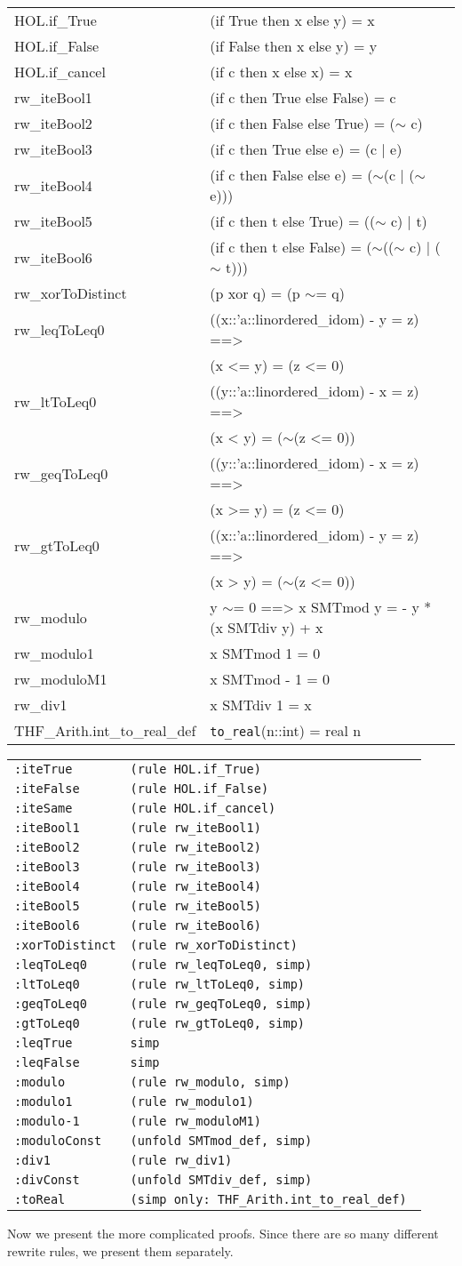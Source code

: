 \documentclass[10pt,a4paper]{article}
\newcommand{\ttt}{\texttt}
\newcommand{\negat}{\ensuremath{\sim}}
\newcommand{\nega}{\negat\xspace}
\newcommand{\torealx}{\texttt{to\_real}}
\newcommand{\toreal}{\torealx\xspace}
\newenvironment{pt}[1]{\begin{center}\begin{tt}\begin{tabular}{#1}\hline}{\end{tabular}\end{tt}\end{center}}
\newcommand{\pl}[1]{#1 \\[1mm]}
\newcommand{\pll}[1]{#1 \\\hline}
\newenvironment{rt}{\begin{center}\begin{tabular}{|l l|}\hline}{\end{tabular}\end{center}}
\newcommand{\rl}[2]{\rm{#1} & \tt{#2} \\[1mm]}
\newcommand{\rll}[2]{\rm{#1} & \tt{#2} \\\hline}
\def\ind{\quad}
\begin{document}
\begin{pt}{ll}
	\pl{HOL.if\_True & (if True then x else y) = x}
	\pl{HOL.if\_False & (if False then x else y) = y}
	\pl{HOL.if\_cancel & (if c then x else x) = x}
	\pl{rw\_iteBool1 & (if c then True else False) = c}
	\pl{rw\_iteBool2 & (if c then False else True) = (\nega c)}
	\pl{rw\_iteBool3 & (if c then True else e) = (c | e)}
	\pl{rw\_iteBool4 & (if c then False else e) = (\nega (c | (\nega e)))}
	\pl{rw\_iteBool5 & (if c then t else True) = ((\nega c) | t)}
	\pl{rw\_iteBool6 & (if c then t else False) = (\nega ((\nega c) | (\nega t)))}
	\pl{rw\_xorToDistinct & (p xor q) = (p \negat= q)}
	\pl{rw\_leqToLeq0 & ((x::'a::linordered\_idom) - y = z) ==>}
		\pl{& \ind (x <= y) = (z <= 0)}
	\pl{rw\_ltToLeq0 & ((y::'a::linordered\_idom) - x = z) ==>}
		\pl{& \ind (x < y) = (\nega (z <= 0))}
	\pl{rw\_geqToLeq0 & ((y::'a::linordered\_idom) - x = z) ==>}
		\pl{& \ind (x >= y) = (z <= 0)}
	\pl{rw\_gtToLeq0 & ((x::'a::linordered\_idom) - y = z) ==>}
		\pl{& \ind (x > y) = (\nega (z <= 0))}
	\pl{rw\_modulo & y \negat= 0 ==> x SMTmod y = - y * (x SMTdiv y) + x}
	\pl{rw\_modulo1 & x SMTmod 1 = 0}
	\pl{rw\_moduloM1 & x SMTmod - 1 = 0}
	\pl{rw\_div1 & x SMTdiv 1 = x}
	\pll{THF\_Arith.int\_to\_real\_def & \toreal (n::int) = real n}
\end{pt}
%
\begin{rt}
	\rl{\ttt{:iteTrue}}{(rule HOL.if\_True)}
	\rl{\ttt{:iteFalse}}{(rule HOL.if\_False)}
	\rl{\ttt{:iteSame}}{(rule HOL.if\_cancel)}
	\rl{\ttt{:iteBool1}}{(rule rw\_iteBool1)}
	\rl{\ttt{:iteBool2}}{(rule rw\_iteBool2)}
	\rl{\ttt{:iteBool3}}{(rule rw\_iteBool3)}
	\rl{\ttt{:iteBool4}}{(rule rw\_iteBool4)}
	\rl{\ttt{:iteBool5}}{(rule rw\_iteBool5)}
	\rl{\ttt{:iteBool6}}{(rule rw\_iteBool6)}
	\rl{\ttt{:xorToDistinct}}{(rule rw\_xorToDistinct)}
	\rl{\ttt{:leqToLeq0}}{(rule rw\_leqToLeq0, simp)}
	\rl{\ttt{:ltToLeq0}}{(rule rw\_ltToLeq0, simp)}
	\rl{\ttt{:geqToLeq0}}{(rule rw\_geqToLeq0, simp)}
	\rl{\ttt{:gtToLeq0}}{(rule rw\_gtToLeq0, simp)}
	\rl{\ttt{:leqTrue}}{simp}
	\rl{\ttt{:leqFalse}}{simp}
	\rl{\ttt{:modulo}}{(rule rw\_modulo, simp)}
	\rl{\ttt{:modulo1}}{(rule rw\_modulo1)}
	\rl{\ttt{:modulo-1}}{(rule rw\_moduloM1)}
	\rl{\ttt{:moduloConst}}{(unfold SMTmod\_def, simp)}
	\rl{\ttt{:div1}}{(rule rw\_div1)}
	\rl{\ttt{:divConst}}{(unfold SMTdiv\_def, simp)}
	\rll{\ttt{:toReal}}{(simp only:~THF\_Arith.int\_to\_real\_def)}
\end{rt}

Now we present the more complicated proofs. Since there are so many different rewrite rules, we present them separately.
\end{document}
